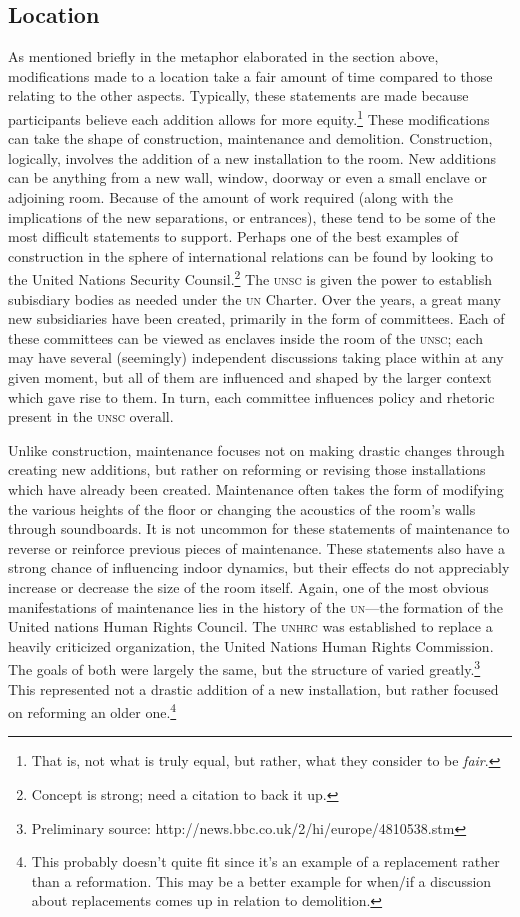 \documentclass{article}
\begin{document}
\subsection{Location}
As mentioned briefly in the metaphor elaborated in the section above, modifications made to a location take a fair amount of time compared to those relating to the other aspects.
Typically, these statements are made because participants believe each addition allows for more equity.\footnote{That is, not what is truly equal, but rather, what they consider to be \emph{fair}.}
These modifications can take the shape of construction, maintenance and demolition.
Construction, logically, involves the addition of a new installation to the room.
New additions can be anything from a new wall, window, doorway or even a small enclave or adjoining room.
Because of the amount of work required (along with the implications of the new separations, or entrances), these tend to be some of the most difficult statements to support.
Perhaps one of the best examples of construction in the sphere of international relations can be found by looking to the United Nations Security Counsil.\footnote{Concept is strong; need a citation to back it up.}
The \textsc{unsc} is given the power to establish subisdiary bodies as needed under the \textsc{un} Charter.
Over the years, a great many new subsidiaries have been created, primarily in the form of committees.
Each of these committees can be viewed as enclaves inside the room of the \textsc{unsc}; each may have several (seemingly) independent discussions taking place within at any given moment, but all of them are influenced and shaped by the larger context which gave rise to them.
In turn, each committee influences policy and rhetoric present in the \textsc{unsc} overall.

Unlike construction, maintenance focuses not on making drastic changes through creating new additions, but rather on reforming or revising those installations which have already been created.
Maintenance often takes the form of modifying the various heights of the floor or changing the acoustics of the room's walls through soundboards.
It is not uncommon for these statements of maintenance to reverse or reinforce previous pieces of maintenance.
These statements also have a strong chance of influencing indoor dynamics, but their effects do not appreciably increase or decrease the size of the room itself.
Again, one of the most obvious manifestations of maintenance lies in the history of the \textsc{un}---the formation of the United nations Human Rights Council.
The \textsc{unhrc} was established to replace a heavily criticized organization, the United Nations Human Rights Commission.
The goals of both were largely the same, but the structure of varied greatly.\footnote{Preliminary source: http://news.bbc.co.uk/2/hi/europe/4810538.stm}
This represented not a drastic addition of a new installation, but rather focused on reforming an older one.\footnote{This probably doesn't quite fit since it's an example of a replacement rather than a reformation. This may be a better example for when/if a discussion about replacements comes up in relation to demolition.}
\end{document}
